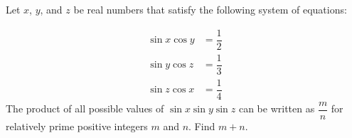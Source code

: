 Let $x$, $y$, and $z$ be real numbers that satisfy the following system of equations:

\begin{align*}
\sin x\cos y&=\dfrac{1}{2}\\
\sin y\cos z&=\dfrac{1}{3}\\
\sin z\cos x&=\dfrac{1}{4}
\end{align*}
The product of all possible values of $\sin x\sin y\sin z$ can be written as $\dfrac{m}{n}$ for relatively prime positive integers $m$ and $n$. Find $m+n$.
